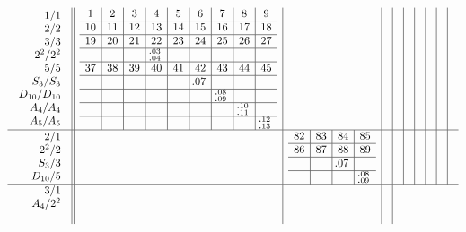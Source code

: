 \documentclass[12pt,a4paper]{amsart}
\begin{document}
\begin{align*}
  \begin{array}{r||c|c|c|c|c|c|c|c|c}
    \begin{array}{r}
      1/1 \\ 2/2 \\ 3/3 \\ 2^2/2^2 \\ 5/5 \\ S_3/S_3 \\
      D_{10}/D_{10} \\ A_4/A_4 \\ A_5/A_5
    \end{array}
&
  \begin{array}{c|c|c|c|c|c|c|c|c}
1&2&3&4&5&6&7&8&9\\
\hline
10&11&12&13&14&15&16&17&18\\
\hline
19&20&21&22&23&24&25&26&27\\
\hline
&&&^{\llap.03}_{\llap.04}&&&&&\\
\hline
37&38&39&40&41&42&43&44&45\\
\hline
&&&&&\llap.07&&&\\
\hline
&&&&&&^{\llap.08}_{\llap.09}&&\\
\hline
&&&&&&&^{\llap.10}_{\llap.11}&\\
\hline
&&&&&&&&^{\llap.12}_{\llap.13}\\
  \end{array}
&&&&&&&& \\\hline
    \begin{array}{r}
      2/1 \\ 2^2/2 \\ S_3/3 \\ D_{10}/5 \\
    \end{array}
&&
   \begin{array}{c|c|c|c}
     82&83&84&85\\
\hline
86&87&88&89\\
\hline
&&\llap.07&\\
\hline
&&&^{\llap.08}_{\llap.09}\\
   \end{array}
&&&&&&& \\\hline
    \begin{array}{r}
      3/1 \\ A_4/2^2 \\ \\
    \end{array}
&&&
    \begin{array}{c|cc}

\end{array}
\end{array}
\end{align*}
\end{document}
